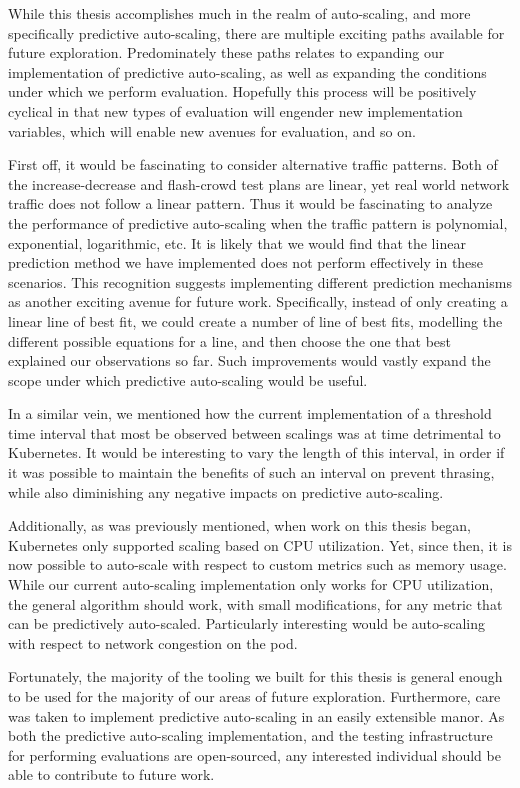 While this thesis accomplishes much in the realm of auto-scaling, and more
specifically predictive auto-scaling, there are multiple exciting paths
available for future exploration. Predominately these paths relates to expanding
our implementation of predictive auto-scaling, as well as expanding the
conditions under which we perform evaluation. Hopefully this process will be
positively cyclical in that new types of evaluation will engender new
implementation variables, which will enable new avenues for evaluation, and so
on.

First off, it would be fascinating to consider alternative traffic patterns.
Both of the increase-decrease and flash-crowd test plans are linear, yet real
world network traffic does not follow a linear pattern. Thus it would be
fascinating to analyze the performance of predictive auto-scaling when the
traffic pattern is polynomial, exponential, logarithmic, etc. It is likely that
we would find that the linear prediction method we have implemented does not
perform effectively in these scenarios. This recognition suggests implementing
different prediction mechanisms as another exciting avenue for future work.
Specifically, instead of only creating a linear line of best fit, we could
create a number of line of best fits, modelling the different possible equations
for a line, and then choose the one that best explained our observations so far.
Such improvements would vastly expand the scope under which predictive
auto-scaling would be useful.

In a similar vein, we mentioned how the current implementation of a threshold time
interval that most be observed between scalings was at time detrimental to
Kubernetes. It would be interesting to vary the length of this interval, in
order if it was possible to maintain the benefits of such an interval on prevent
thrasing, while also diminishing any negative impacts on predictive
auto-scaling.

Additionally, as was previously mentioned, when work on this thesis began,
Kubernetes only supported scaling based on CPU utilization. Yet, since then, it
is now possible to auto-scale with respect to custom metrics such as memory
usage. While our current auto-scaling implementation only works for CPU
utilization, the general algorithm should work, with small modifications, for
any metric that can be predictively auto-scaled. Particularly interesting would
be auto-scaling with respect to network congestion on the pod.

Fortunately, the majority of the tooling we built for this thesis is general
enough to be used for the majority of our areas of future exploration.
Furthermore, care was taken to implement predictive auto-scaling in an easily
extensible manor. As both the predictive auto-scaling implementation, and the
testing infrastructure for performing evaluations are open-sourced, any
interested individual should be able to contribute to future work.


